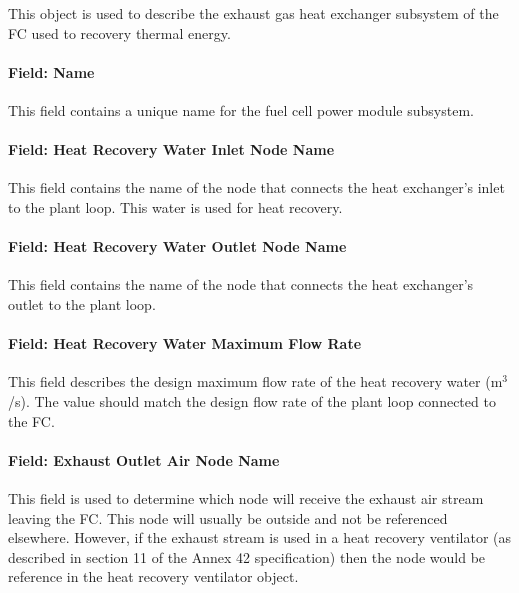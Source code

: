 This object is used to describe the exhaust gas heat exchanger subsystem of the FC used to recovery thermal energy.

\paragraph{Field: Name}\label{field-name-19-000}

This field contains a unique name for the fuel cell power module subsystem.

\paragraph{Field: Heat Recovery Water Inlet Node Name}\label{field-heat-recovery-water-inlet-node-name-2}

This field contains the name of the node that connects the heat exchanger's inlet to the plant loop. This water is used for heat recovery.

\paragraph{Field: Heat Recovery Water Outlet Node Name}\label{field-heat-recovery-water-outlet-node-name-1}

This field contains the name of the node that connects the heat exchanger's outlet to the plant loop.

\paragraph{Field: Heat Recovery Water Maximum Flow Rate}\label{field-heat-recovery-water-maximum-flow-rate}

This field describes the design maximum flow rate of the heat recovery water (m\(^{3}\)/s). The value should match the design flow rate of the plant loop connected to the FC.

\paragraph{Field: Exhaust Outlet Air Node Name}\label{field-exhaust-outlet-air-node-name}

This field is used to determine which node will receive the exhaust air stream leaving the FC. This node will usually be outside and not be referenced elsewhere. However, if the exhaust stream is used in a heat recovery ventilator (as described in section 11 of the Annex 42 specification) then the node would be reference in the heat recovery ventilator object.


